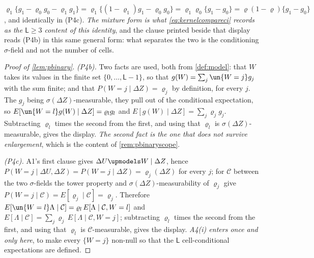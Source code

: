 \begin{lemma}
$\varrho_1\{g_1-\varrho_0g_0-\varrho_1g_1\}=\varrho_1\{(1-\varrho_1)g_1-\varrho_0g_0\}
=\varrho_1\varrho_0\{g_1-g_0\}=\varrho(1-\varrho)\{g_1-g_0\}$, and identically in \textup{(P4c)}.
\emph{The mixture form is what \eqref{eq:kernelcompareci} records as the $\mathsf L\ge3$ content of this
identity}, and the clause printed beside that display reads \textup{(P4b)} in this same general form:
what separates the two is the conditioning $\sigma$-field and not the number of cells.
\end{lemma}

\begin{proof}[Proof of \cref{lem:pbinary}]
\emph{\textup{(P4b)}.} Two facts are used, both from \cref{def:model}: that $W$ takes its values in the
finite set $\{0,\dots,\mathsf L-1\}$, so that $g(W)=\sum_{j}\un\{W=j\}g_j$ with the sum finite; and that
$P(W=j\mid\Delta Z)=\varrho_j$ by definition, for every $j$. The $g_j$ being
$\sigma(\Delta Z)$-measurable, they pull out of the conditional expectation, so
$E[\un\{W=l\}g(W)\mid\Delta Z]=\varrho_lg_l$ and $E[g(W)\mid\Delta Z]=\sum_j\varrho_jg_j$. Subtracting
$\varrho_l$ times the second from the first, and using that $\varrho_l$ is $\sigma(\Delta Z)$-measurable,
gives the display. \emph{The second fact is the one that does not survive enlargement}, which is the
content of \cref{rem:pbinaryscope}.

\emph{\textup{(P4c)}.} A1's first clause gives $\Delta U\upmodels W\mid\Delta Z$, hence
$P(W=j\mid\Delta U,\Delta Z)=P(W=j\mid\Delta Z)=\varrho_j(\Delta Z)$ for every $j$; for $\mathcal C$
between the two $\sigma$-fields the tower property and $\sigma(\Delta Z)$-measurability of $\varrho_j$
give $P(W=j\mid\mathcal C)=E[\varrho_j\mid\mathcal C]=\varrho_j$. Therefore
$E[\un\{W=l\}\Lambda\mid\mathcal C]=\varrho_l\,E[\Lambda\mid\mathcal C,W=l]$ and
$E[\Lambda\mid\mathcal C]=\sum_j\varrho_j\,E[\Lambda\mid\mathcal C,W=j]$; subtracting $\varrho_l$ times
the second from the first, and using that $\varrho_l$ is $\mathcal C$-measurable, gives the display.
\emph{A4(i) enters once and only here}, to make every $\{W=j\}$ non-null so that the $\mathsf L$
cell-conditional expectations are defined.
\end{proof}

